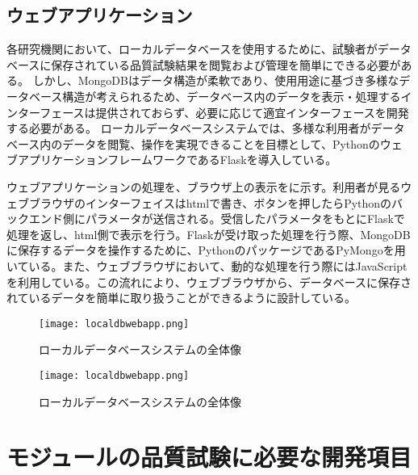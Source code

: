 \subsection{ウェブアプリケーション}
\label{sec:flask}

各研究機関において、ローカルデータベースを使用するために、試験者がデータベースに保存されている品質試験結果を閲覧および管理を簡単にできる必要がある。
しかし、MongoDBはデータ構造が柔軟であり、使用用途に基づき多様なデータベース構造が考えられるため、データベース内のデータを表示・処理するインターフェースは提供されておらず、必要に応じて適宜インターフェースを開発する必要がある。
ローカルデータベースシステムでは、多様な利用者がデータベース内のデータを閲覧、操作を実現できることを目標として、PythonのウェブアプリケーションフレームワークであるFlaskを導入している。

ウェブアプリケーションの処理を、ブラウザ上の表示をに示す。利用者が見るウェブブラウザのインターフェイスはhtmlで書き、ボタンを押したらPythonのバックエンド側にパラメータが送信される。受信したパラメータをもとにFlaskで処理を返し、html側で表示を行う。Flaskが受け取った処理を行う際、MongoDBに保存するデータを操作するために、PythonのパッケージであるPyMongoを用いている。また、ウェブブラウザにおいて、動的な処理を行う際にはJavaScriptを利用している。この流れにより、ウェブブラウザから、データベースに保存されているデータを簡単に取り扱うことができるように設計している。

\begin{figure}[tbp]
  \centering
  \texttt{[image: localdbwebapp.png]}
  \caption[ローカルデータベースシステムの全体像]{ローカルデータベースシステムの全体像}
  \label{fig:webapp}
\end{figure}
\begin{figure}[tbp]
  \centering
  \texttt{[image: localdbwebapp.png]}
  \caption[ローカルデータベースシステムの全体像]{ローカルデータベースシステムの全体像}
  \label{fig:webbrowser}
\end{figure}

\section{モジュールの品質試験に必要な開発項目}
\label{sec:okubottan}

